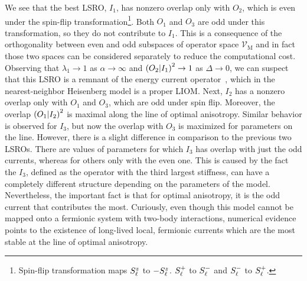 We see that the best LSRO, \(I_1\), has nonzero overlap only with \(O_2\), which is even under the
spin-flip transformation\footnote{Spin-flip transformation maps \(S^{z}_{\ell}\) to \(-S^{z}_{\ell}\).
  \(S^{+}_{\ell}\) to \(S^{-}_{\ell}\) and \(S^{-}_{\ell}\) to \(S^{+}_{\ell}\).}.
Both \(O_1\) and \(O_3\) are odd under this transformation, so they do not contribute to \(I_1\).
This is a consequence of the orthogonality between even and odd subspaces of operator space \(\mathcal{V}_{\textrm{M}}\)
and in fact those two spaces can be considered separately to reduce the computational cost.
Observing that \(\lambda_1 \to 1\) as \(\alpha \to \infty\) and \(\left(O_2 \middle| I_1\right)^2 \to 1\) as
\(\Delta\to 0\), we can suspect that this LSRO is a remnant of the energy current operator~\autocite{Zotos1997},
which in the nearest-neighbor Heisenberg model is a proper LIOM.
Next, \(I_2\) has a nonzero overlap only with \(O_1\) and \(O_3\), which are odd under spin flip.
Moreover, the overlap \(\left(O_1 \middle| I_2\right)^2\) is maximal along the line of optimal anisotropy.
Similar behavior is observed for \(I_3\), but now the overlap with \(O_3\) is maximized for parameters
on the line. However, there is a slight difference in comparison to the previous two LSROs. There are
values of parameters for which \(I_3\) has overlap with just the odd currents, whereas for others
only with the even one. This is caused by the fact the \(I_3\), defined as the operator with
the third largest stiffness, can have a completely different structure depending on the parameters of
the model. Nevertheless, the important fact is that for optimal anisotropy, it is the odd
current that contributes the most. Curiously, even though this model cannot be mapped
onto a fermionic system with two-body interactions, numerical evidence points to the existence of long-lived
local, fermionic currents which are the most stable at the line of optimal anisotropy.

